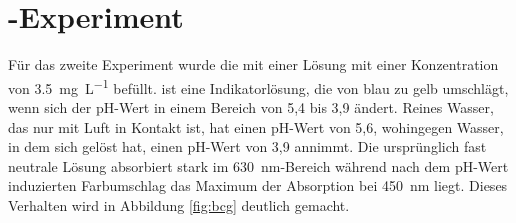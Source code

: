 % 



\section{\COT-Experiment}
\label{sec:cot}
Für das zweite Experiment wurde die \HSCs mit einer \BCG Lösung mit einer Konzentration von \SI{3,5}{\milli\gram\per\liter} befüllt. 
\BCG ist eine Indikatorlösung, die von blau zu gelb umschlägt, wenn sich der pH-Wert in einem Bereich von 5,4 bis 3,9 ändert. Reines Wasser, das nur mit Luft in Kontakt ist, hat einen pH-Wert von 5,6, wohingegen Wasser, in dem sich \COT gelöst hat, einen pH-Wert von 3,9 annimmt. Die ursprünglich fast neutrale Lösung absorbiert stark im \SI{630}{\nano\meter}-Bereich während nach dem pH-Wert induzierten Farbumschlag das Maximum der Absorption bei \SI{450}{\nano\meter} liegt. Dieses Verhalten wird in Abbildung \ref{fig:bcg} deutlich gemacht.

